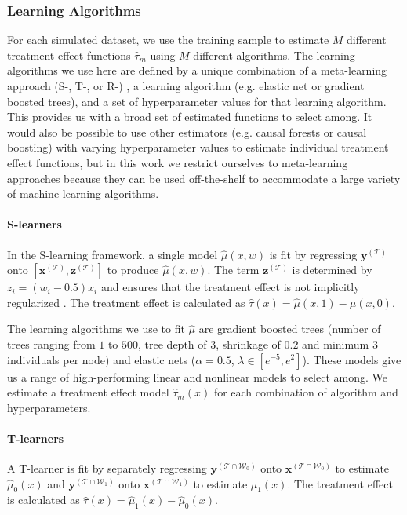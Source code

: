 \subsubsection{Learning Algorithms}

For each simulated dataset, we use the training sample to estimate $M$ different treatment effect functions $\hat\tau_m$ using $M$ different algorithms. The learning algorithms we use here are defined by a unique combination of a meta-learning approach (S-, T-, or R-) \cite{Kunzel:2017vg, Nie:2017vi}, a learning algorithm (e.g. elastic net or gradient boosted trees), and a set of hyperparameter values for that learning algorithm. This provides us with a broad set of estimated functions to select among. It would also be possible to use other estimators (e.g. causal forests or causal boosting) with varying hyperparameter values to estimate individual treatment effect functions, but in this work we restrict ourselves to meta-learning approaches because they can be used off-the-shelf to accommodate a large variety of machine learning algorithms.

\paragraph{S-learners}  In the S-learning framework, a single model $\hat\mu(x,w)$ is fit by regressing $\bm y^{(\mathcal T)}$ onto $[\bm x^{(\mathcal T)}, \bm z^{(\mathcal T)}]$ to produce $\hat\mu(x,w)$. The term $\bm z^{(\mathcal T)}$ is determined by $z_i = ( w_i- 0.5) x_i$ and ensures that the treatment effect is not implicitly regularized \cite{Nie:2017vi}. The treatment effect is calculated as $\hat\tau(x) = \hat\mu(x,1) - \hat\mu(x,0)$. 

The learning algorithms we use to fit $\hat\mu$ are gradient boosted trees (number of trees ranging from $1$ to $500$, tree depth of $3$, shrinkage of $0.2$ and minimum $3$ individuals per node) and elastic nets ($\alpha=0.5$, $\lambda \in [e^{-5}, e^2]$). These models give us a range of high-performing linear and nonlinear models to select among. We estimate a treatment effect model $\hat\tau_m(x)$ for each combination of algorithm and hyperparameters.

\paragraph{T-learners} A T-learner is fit by separately regressing $\bm y^{(\mathcal T \cap \mathcal W_0)}$ onto $\bm x^{(\mathcal T \cap \mathcal W_0)}$ to estimate $\hat\mu_0(x)$ and $\bm y^{(\mathcal T \cap \mathcal W_1)}$ onto $\bm x^{(\mathcal T \cap \mathcal W_1)}$ to estimate $\hat\mu_1(x)$. The treatment effect is calculated as $\hat\tau(x) = \hat\mu_1(x) - \hat\mu_0(x)$. 

